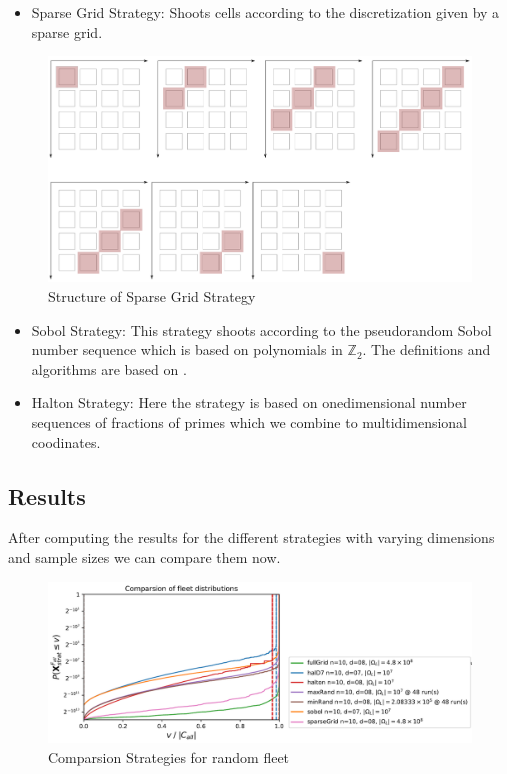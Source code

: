 \documentclass[final,hyperref={pdfpagelabels=false},table]{beamer}
\begin{document}
\begin{frame}
\begin{columns}[T]
\begin{column}{\colCWidth}
\justifying
\begin{itemize}
	\item Sparse Grid Strategy: Shoots cells according to the discretization given by a sparse grid.
\end{itemize}
\begin{figure}[h]
	\centering
	\includegraphics[width=\textwidth]{../gfx/Grids05.png}
	\caption{Structure of Sparse Grid Strategy}
\end{figure}
\begin{itemize}
	\item Sobol Strategy: This strategy shoots according to the pseudorandom Sobol number sequence which is based on polynomials in $\mathbb{Z}_2$. The definitions and algorithms are based on \cite{JK}.
	\item Halton Strategy: Here the strategy is based on onedimensional number sequences of fractions of primes which we combine to multidimensional coodinates.
\end{itemize}

\subsection{Results}

After computing the results for the different strategies with varying dimensions and sample sizes we can compare them now. 

\begin{figure}[h]
	\centering
	\includegraphics[width=\textwidth]{../gfx/Compare01.png}
	\caption{Comparsion Strategies for random fleet}
	\label{fig:comp01}
\end{figure}


\end{column}
\end{columns}
\end{frame}
\end{document}
